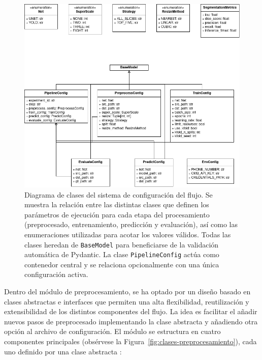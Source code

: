 \documentclass[../main.tex]{subfiles}
\begin{document}
\begin{figure}
    \centering
    \includegraphics[width=0.8\linewidth]{imgs//impl/diag-clases.drawio.png}
    \caption{Diagrama de clases del sistema de configuración del flujo. Se muestra la relación entre las distintas clases que definen los parámetros de ejecución para cada etapa del procesamiento (preprocesado, entrenamiento, predicción y evaluación), así como las enumeraciones utilizadas para acotar los valores válidos. Todas las clases heredan de \texttt{BaseModel} para beneficiarse de la validación automática de Pydantic. La clase \texttt{PipelineConfig} actúa como contenedor central y se relaciona opcionalmente con una única configuración activa.}
    \label{fig:clases}
\end{figure}


Dentro del módulo de preprocesamiento, se ha optado por un diseño basado en clases abstractas e interfaces que permiten una alta flexibilidad, reutilización y extensibilidad de los distintos componentes del flujo. La idea es facilitar el añadir nuevos pasos de preprocesado implementando la clase abstracta y añadiendo otra opción al archivo de configuración. El módulo se estructura en cuatro componentes principales (obsérvese la Figura~\ref{fig:clases-preprocesamiento}), cada uno definido por una clase abstracta :
\end{document}
